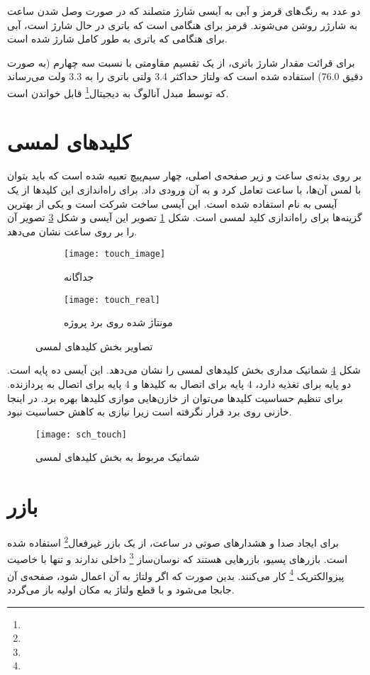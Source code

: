 دو عدد  به رنگ‌های قرمز و آبی به آیسی شارژ متصلند که در صورت وصل شدن ساعت به شارژر روشن می‌شوند. قرمز برای هنگامی است که باتری در حال شارژ است، آبی برای هنگامی که باتری به طور کامل شارژ شده است.

برای قرائت مقدار شارژ باتری، از یک تقسیم مقاومتی با نسبت سه چهارم (به صورت دقیق 76.0) استفاده شده است که ولتاژ حداکثر 3.4 ولتی باتری را به 3.3 ولت می‌رساند که توسط مبدل آنالوگ به دیجیتال\footnote{} قابل خواندن است.

\section{کلیدهای لمسی}
بر روی بدنه‌ی ساعت و زیر صفحه‌ی اصلی، چهار سیم‌پیچ تعبیه شده است که باید بتوان با لمس آن‌ها، با ساعت تعامل کرد و به آن ورودی داد. برای راه‌اندازی این کلیدها از یک آیسی به نام  استفاده شده است. این آیسی ساخت شرکت  است و یکی از بهترین گزینه‌ها برای راه‌اندازی کلید لمسی است. شکل \ref{fig:touch_image} تصویر این آیسی و شکل \ref{fig:touch_real} تصویر آن را بر روی \pcbf ساعت نشان می‌دهد.

\begin{figure}[h]
	\centering
	\begin{subfigure}{0.35\textwidth}
		\centering
		\texttt{[image: touch\_image]}
		\caption{جداگانه}
		\label{fig:touch_image}
	\end{subfigure}
	\begin{subfigure}{0.4\textwidth}
		\centering
		\texttt{[image: touch\_real]}
		\caption{مونتاژ شده روی برد پروژه}
		\label{fig:touch_real}
	\end{subfigure}
	\caption{تصاویر بخش کلیدهای لمسی}
\end{figure}

شکل \ref{fig:sch-touch} شماتیک مداری بخش کلیدهای لمسی را نشان می‌دهد. این آیسی ده پایه است. دو پایه برای تغذیه دارد، 4 پایه برای اتصال به کلیدها و 4 پایه برای اتصال به پردازنده. برای تنظیم حساسیت کلیدها می‌توان از خازن‌هایی موازی کلیدها بهره برد. در اینجا خازنی روی برد قرار نگرفته است زیرا نیازی به کاهش حساسیت نبود.

\begin{figure}[h]
	\centering
	\texttt{[image: sch\_touch]}
	\caption{شماتیک مربوط به بخش کلیدهای لمسی}
	\label{fig:sch-touch}
\end{figure}

\section{بازر}
برای ایجاد صدا و هشدارهای صوتی در ساعت، از یک بازر غیرفعال\footnote{} استفاده شده است. بازرهای پسیو، بازرهایی هستند که نوسان‌ساز \footnote{} داخلی ندارند و تنها با خاصیت پیزوالکتریک \footnote{} کار می‌کنند. بدین صورت که اگر ولتاژ به آن اعمال شود، صفحه‌ی آن جابجا می‌شود و با قطع ولتاژ به مکان اولیه باز می‌گردد.

